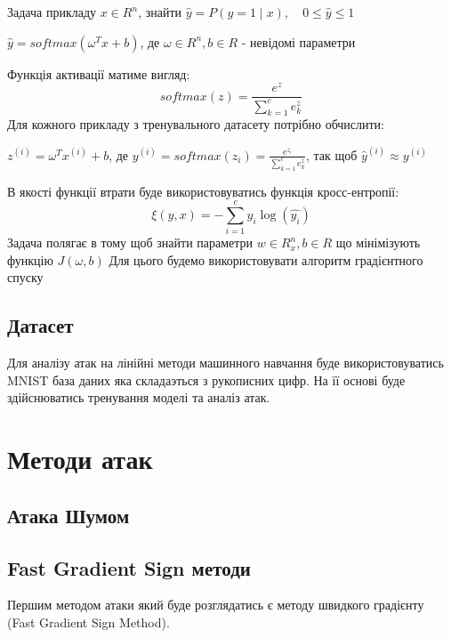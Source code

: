 \documentclass[a4paper,14pt]{extreport}
\newcommand{\tran}{^{T}}
\newcommand{\ith}{^{(i)}}
\begin{document}
	\newline \newline
	Задача прикладу $x \in R^{n}$, знайти $\hat{y}=P(y = 1 \mid x), \quad 0 \leq \hat{y} \leq 1$
	\begin{center}
	$\hat{y} = softmax(\omega\tran x + b)$, \quad де $\omega \in R^{n}, b \in R$ - невідомі параметри
	\end{center}
	Функція активації матиме вигляд:
	\begin{equation}
		softmax(z) = \frac{e^{z}}{\sum_{k=1}^{c} e_k^z}
	\end{equation}
	Для кожного прикладу з тренувального датасету потрібно обчислити:
	\begin{center}
	$ z\ith = \omega\tran x\ith + b $, \quad де	$y\ith = softmax(z_i) = \frac{e^{z_i}}{\sum_{k=1}^{c} e_k^z}$, так щоб $\hat{y}\ith \approx y\ith $
	\end{center}
	В якості функції втрати буде використовуватись функція кросс-ентропії:
	\begin{equation}
		\xi(y, x) = - \sum_{i=1}^{c} y_i  \log (\hat{y_i})
	\end{equation}
	Задача полягає в тому щоб знайти параметри $w \in R^n_x, b\in R$ що мінімізують функцію $J(\omega, b)$
	Для цього будемо використовувати алгоритм градієнтного спуску
	
	\section{Датасет}
	Для аналізу атак на лінійні методи машинного навчання буде використовуватись MNIST база даних яка складаэться з рукописних цифр. На її основі буде здійснюватись тренування моделі та аналіз атак.
	
	\chapter{Методи атак} 

	\section{Атака Шумом}

	\section{Fast Gradient Sign методи}
	Першим методом атаки який буде розглядатись є методу швидкого градієнту (Fast Gradient Sign Method).
\end{document}
